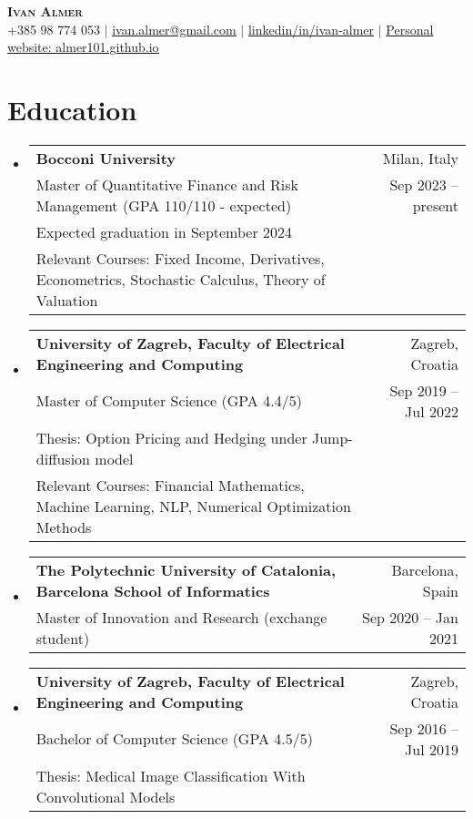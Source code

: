 \documentclass[letterpaper,11pt]{article}
\makeatletter
\newcommand{\resumeSubheading}[4]{
  \vspace{-2pt}\item
    \begin{tabular*}{0.97\textwidth}[t]{l@{\extracolsep{\fill}}r}
      \textbf{#1} & #2 \\
      \small #3 & \small #4 \\
    \end{tabular*}\vspace{-7pt}
}
\newcommand{\resumeSubheadingWithAdditional}[6]{
  \vspace{-2pt}\item
    \begin{tabular*}{0.97\textwidth}[t]{l@{\extracolsep{\fill}}r}
      \textbf{#1} & #2 \\
      \small #3 & \small #4 \\
      \small #5 \\
      \small #6
    \end{tabular*}\vspace{-7pt}
}
\newcommand{\resumeSubheadingWithAdditionall}[5]{
  \vspace{-2pt}\item
    \begin{tabular*}{0.97\textwidth}[t]{l@{\extracolsep{\fill}}r}
      \textbf{#1} & #2 \\
      \small #3 & \small #4 \\
      \small #5
    \end{tabular*}\vspace{-7pt}
}
\newcommand{\resumeSubHeadingListStart}{\begin{itemize}[leftmargin=0.15in, label={}]}
\newcommand{\resumeSubHeadingListEnd}{\end{itemize}}
\makeatother
\begin{document}

\begin{center}
    \textbf{\huge \scshape Ivan Almer} \\ \vspace{2pt}
    \small +385 98 774 053 $|$ \href{mailto:ivan.almer@gmail.com}{\underline{ivan.almer@gmail.com}} $|$ 
    \href{https://linkedin.com/in/ivan-almer/}{\underline{linkedin/in/ivan-almer}} $|$
    \href{https://almer101.github.io/intro.html}{Personal website: \underline{almer101.github.io}}
\end{center}

\vspace{-10pt}
\section{Education}
  \resumeSubHeadingListStart
    \resumeSubheadingWithAdditional
      {Bocconi University}{Milan, Italy}
      {Master of Quantitative Finance and Risk Management (GPA 110/110 - expected)}{Sep 2023 -- present}{Expected graduation in September 2024}{Relevant Courses: Fixed Income, Derivatives, Econometrics, Stochastic Calculus, Theory of Valuation}
    \resumeSubheadingWithAdditional
      {University of Zagreb, Faculty of Electrical Engineering and Computing}{Zagreb, Croatia}
      {Master of Computer Science (GPA 4.4/5)}{Sep 2019 -- Jul 2022}{Thesis: Option Pricing and Hedging under Jump-diffusion model}
      {Relevant Courses: Financial Mathematics, Machine Learning, NLP, Numerical Optimization Methods}
    \resumeSubheading 
      {The Polytechnic University of Catalonia, Barcelona School of Informatics}{Barcelona, Spain}
      {Master of Innovation and Research (exchange student)}{Sep 2020 -- Jan 2021}
    \resumeSubheadingWithAdditionall
      {University of Zagreb, Faculty of Electrical Engineering and Computing}{Zagreb, Croatia}
      {Bachelor of Computer Science (GPA 4.5/5)}{Sep 2016 -- Jul 2019}{Thesis: Medical Image Classification With Convolutional Models}
  \resumeSubHeadingListEnd
\end{document}
